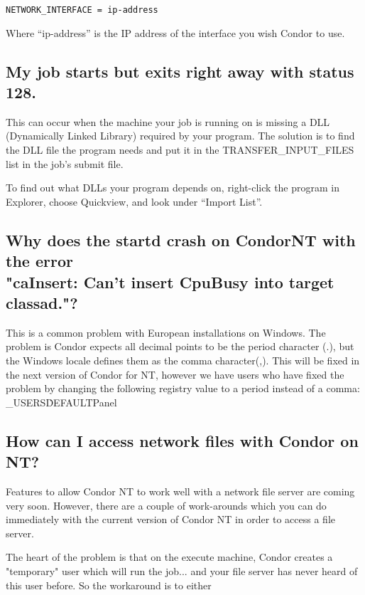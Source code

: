\begin{verbatim}NETWORK_INTERFACE = ip-address\end{verbatim}

Where ``ip-address'' is the IP address of the interface you wish
Condor to use.

\subsection{My job starts but exits right away with status 128.}

This can occur when the machine your job is running on is missing a
DLL (Dynamically Linked Library) required by your program.
The solution is to find the DLL file the program needs and put it in
the TRANSFER\_INPUT\_FILES list in the job's submit file.

To find out what DLLs your program depends on, right-click the program
in Explorer, choose Quickview, and look under ``Import List''.


\subsection{Why does the startd crash on CondorNT with the error\\
"caInsert: Can't insert CpuBusy into target classad."?}

This is a common problem with European installations on Windows.
The problem is Condor expects all decimal points to be the
period character (.),
but the Windows locale defines them as the comma character(,).
This will be fixed in the next version of Condor for NT,
however we have users who have fixed the problem by 
changing the following registry value to a period instead of a comma:
\verb@HKEY_USERS\.DEFAULT\Control Panel\International\sDecimal@

\subsection{How can I access network files with Condor on NT?}

Features to allow Condor NT to work well with a network file server are 
coming very soon.  However, there are a couple of work-arounds which you 
can do immediately with the current version of Condor NT in order to access 
a file server.

The heart of the problem is that on the execute machine, Condor creates a 
"temporary" user which will run the job... and your file server has never 
heard of this user before.  So the workaround is to either

